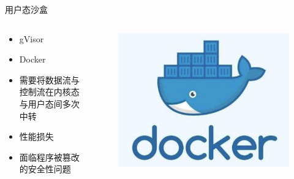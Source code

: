 \documentclass[UTF8,fontset=macnew,xcolor=table]{ctexbeamer}
\begin{document}
\begin{frame}{用户态沙盒}
    \begin{columns}
        \begin{column}{0.5\textwidth}
            \begin{itemize}
                \item gVisor
                \item Docker
                
                
                \item 需要将数据流与控制流在内核态与用户态间多次中转
                \item 性能损失
                \item 面临程序被篡改的安全性问题
            \end{itemize}
        \end{column}

        \begin{column}{0.5\textwidth}
            \begin{figure}[H]
                \centering
                \includegraphics[width=\columnwidth]{pic3.png}
            \end{figure}
        \end{column}
    \end{columns}
\end{frame}
\end{document}
